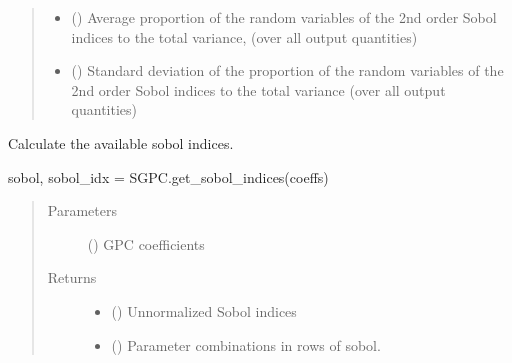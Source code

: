 \documentclass[letterpaper,10pt,english,openany,oneside]{sphinxmanual}
\begin{document}
\begin{fulllineitems}
\begin{fulllineitems}
\begin{quote}
\begin{description}
\begin{itemize}
\item {} 
 () \textendash{} Average proportion of the random variables of the 2nd order Sobol indices to the total variance,
(over all output quantities)

\item {} 
 () \textendash{} Standard deviation of the proportion of the random variables of the 2nd order Sobol indices to the total
variance
(over all output quantities)

\end{itemize}


\end{description}\end{quote}

\end{fulllineitems}


\begin{fulllineitems}
\label{\detokenize{pygpc:pygpc.SGPC.SGPC.get_sobol_indices}}
Calculate the available sobol indices.

sobol, sobol\_idx = SGPC.get\_sobol\_indices(coeffs)
\begin{quote}\begin{description}
\item[{Parameters}] \leavevmode
{} (\sphinxstyleliteralemphasis{\sphinxupquote{ {[}}}\sphinxstyleliteralemphasis{\sphinxupquote{{]}}}) \textendash{} GPC coefficients

\item[{Returns}] \leavevmode
\begin{itemize}
\item {} 
 () \textendash{} Unnormalized Sobol indices

\item {} 
 () \textendash{} Parameter combinations in rows of sobol.


\end{itemize}
\end{description}
\end{quote}
\end{fulllineitems}
\end{fulllineitems}
\end{document}
